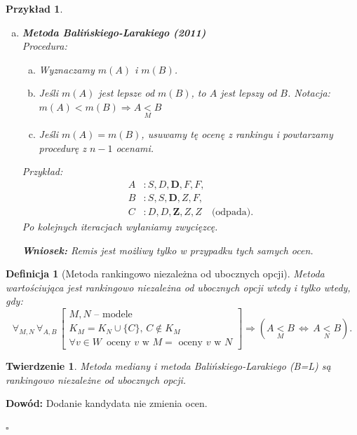 \documentclass[12pt,a4paper]{article}
\theoremstyle{break}
\newtheorem{definition}{Definicja}[section]
\newtheorem{theorem}{Twierdzenie}[section]
\newtheorem{example}{Przykład}[section]
\begin{document}
\begin{example}
\begin{enumerate}[a)]
			\item \textbf{Metoda Balińskiego-Larakiego (2011)} \\
			Procedura:
			\begin{enumerate}[a)]
				\item Wyznaczamy $m(A)$ i $m(B)$.
				\item Jeśli $m(A)$ jest lepsze od $m(B)$, to $A$ jest lepszy od $B$. Notacja: $m(A)<m(B) \Rightarrow A \underset{M}{<}B$
				\item Jeśli $m(A) = m(B)$, usuwamy tę ocenę z rankingu i powtarzamy procedurę z $n-1$ ocenami.
			\end{enumerate}
			Przykład:
			\begin{align*}
				A &: S, D, \mathbf{D}, F, F, \\
				B &: S, S, \mathbf{D}, Z, F, \\
				C &: D, D, \mathbf{Z}, Z, Z \quad \text{(odpada)}.
			\end{align*}
			Po kolejnych iteracjach wyłaniamy zwycięzcę.
			
			\textbf{Wniosek:} Remis jest możliwy tylko w przypadku tych samych ocen.
		\end{enumerate}
	\end{example}
	
	\begin{definition}[Metoda rankingowo niezależna od ubocznych opcji]
		Metoda wartościująca jest rankingowo niezależna od ubocznych opcji wtedy i tylko wtedy, gdy:
		\[
		\forall_{ M, N} \, \forall_ {A, B} \, 
		\begin{bmatrix}
			M, N \text{ -- modele} \\
			K_M = K_N \cup \{C\}, \, C \notin K_M \\
			\forall v \in W \, \text{ oceny } v \text{ w } M = \text{ oceny } v \text{ w } N
		\end{bmatrix}
		\Rightarrow 
		(A \underset{M}{<} B \, \Leftrightarrow \, A \underset{N}{<} B).
		\]
	\end{definition}
	
	\begin{theorem}
		Metoda mediany i metoda Balińskiego-Larakiego (B=L) są rankingowo niezależne od ubocznych opcji.
	\end{theorem}
	
	\noindent \textbf{Dowód:} Dodanie kandydata nie zmienia ocen.  
	\begin{flushright}
		$\square$
	\end{flushright}
	
\end{document}
